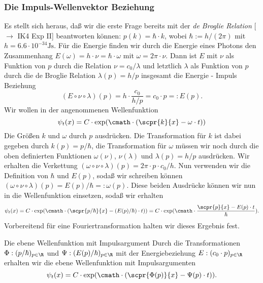 \documentclass{article}
\begin{document}
        \subsubsection*{Die Impuls-Wellenvektor Beziehung}
        Es stellt sich heraus, daß wir die erste Frage bereits mit der \emph{de Broglie Relation} [$\to$ IK4 Exp II] beantworten können: $p(k) = \hbar\cdot k$, wobei $\hbar:=h/(2\pi)$ mit $h = 6.6\cdot 10^{-34}\si{\joule\second}$. Für die Energie finden wir durch die Energie eines Photons den Zusammenhang $E(\omega) = h\cdot\nu = \hbar\cdot\omega$ mit $\omega = 2\pi\cdot\nu$. Dann ist $E$ mit $\nu$ als Funktion von $p$ durch die Relation $\nu = c_0 / \lambda$ und letztlich $\lambda$ als Funktion von $p$ durch die de Broglie Relation $\lambda(p) = h/p$ insgesamt die Energie - Impuls Beziehung 
        \[
            (E\circ\nu\circ\lambda)(p) = h\cdot \frac{c_0}{h / p} = c_0\cdot p =: E(p).
        \]
        Wir wollen in der angenommenen Wellenfunktion
        \[
            \psi_t(x) = C\cdot\exp(\cmath\cdot (\scpr{k}{x}-\omega\cdot t))
        \]
        Die Größen $k$ und $\omega$ durch $p$ ausdrücken. Die Transformation für $k$ ist dabei gegeben durch $k(p) = p/\hbar$, die Transformation für $\omega$ müssen wir noch durch die oben definierten Funktionen $\omega(\nu)$, $\nu(\lambda)$ und $\lambda(p) = h / p$ ausdrücken. Wir erhalten die Verkettung $(\omega\circ\nu\circ\lambda)(p) = 2\pi\cdot p\cdot c_0/h$. Nun verwenden wir die Definition von $\hbar$ und $E(p)$, sodaß wir schreiben können $(\omega\circ\nu\circ\lambda)(p) = E(p) / \hbar =: \omega(p)$. Diese beiden Ausdrücke können wir nun in die Wellenfunktion einsetzen, sodaß wir erhalten
        \[
            \psi_t(x) = C\cdot\exp(\cmath\cdot (\scpr{p/\hbar}{x}-(E(p)/\hbar)\cdot t)) = C\cdot\exp(\cmath\cdot \frac{\scpr{p}{x} - E(p)\cdot t}{\hbar}).
        \]
        Vorbereitend für eine Fouriertransformation halten wir dieses Ergebnis fest. 
        \begin{mcor}{Die ebene Wellenfunktion mit Impulsargument}
            Durch die Transformationen $\Phi:(p/\hbar)_{p\in\R}$ und $\Psi:(E(p)/\hbar)_{p\in\R}$ mit der Energiebeziehung $E:(c_0\cdot p)_{p\in\R}$ erhalten wir die ebene Wellenfunktion mit Impulsargumenten 
            \[
                \psi_t(x) = C\cdot \exp(\cmath\cdot(\scpr{\Phi(p)}{x} - \Psi(p)\cdot t)).
            \]
        \end{mcor}
\end{document}
